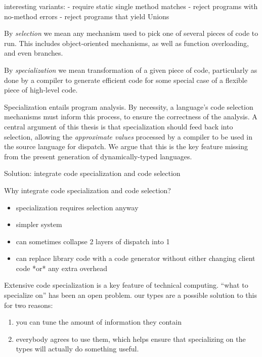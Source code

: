 
interesting variants:
- require static single method matches
- reject programs with no-method errors
- reject programs that yield Unions


By \emph{selection} we mean any mechanism used to pick one of several
pieces of code to run. This includes object-oriented mechanisms, as well
as function overloading, and even branches.

By \emph{specialization} we mean transformation of a given piece of code,
particularly as done by a compiler to generate efficient code for some
special case of a flexible piece of high-level code.

Specialization entails program analysis. By necessity, a language's
code selection mechanisms must inform this process, to ensure the
correctness of the analysis. A central argument of this thesis is that
specialization should feed back into selection, allowing the
\emph{approximate values} processed by a compiler to be used in the
source language for dispatch. We argue that this is the key feature
missing from the present generation of dynamically-typed languages.

Solution: integrate code specialization and code selection

Why integrate code specialization and code selection?

\begin{itemize}
\item specialization requires selection anyway
\item simpler system
\item can sometimes collapse 2 layers of dispatch into 1
\item can replace library code with a code generator without either changing
  client code *or* any extra overhead
\end{itemize}

Extensive code specialization is a key feature of
technical computing. ``what to specialize on'' has been an open problem.
our types are a possible solution to this for two reasons:

\begin{enumerate}
\item you can tune the amount of information they contain
\item everybody agrees to use them, which helps ensure that specializing on
  the types will actually do something useful.
\end{enumerate}


